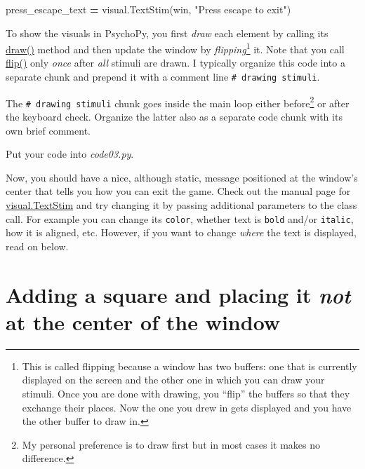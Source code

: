 \documentclass[
]{book}
\newenvironment{Shaded}{\begin{snugshade}}{\end{snugshade}}
\newcommand{\NormalTok}[1]{#1}
\newcommand{\OperatorTok}[1]{\textcolor[rgb]{0.81,0.36,0.00}{\textbf{#1}}}
\newcommand{\StringTok}[1]{\textcolor[rgb]{0.31,0.60,0.02}{#1}}
\begin{document}
\begin{Shaded}
\begin{Highlighting}[]
\NormalTok{press\_escape\_text }\OperatorTok{=}\NormalTok{ visual.TextStim(win, }\StringTok{"Press escape to exit"}\NormalTok{)}
\end{Highlighting}
\end{Shaded}

To show the visuals in PsychoPy, you first \emph{draw} each element by calling its \href{https://psychopy.org/api/visual/textstim.html\#psychopy.visual.TextStim.draw}{draw()} method and then update the window by \emph{flipping}\footnote{This is called flipping because a window has two buffers: one that is currently displayed on the screen and the other one in which you can draw your stimuli. Once you are done with drawing, you ``flip'' the buffers so that they exchange their places. Now the one you drew in gets displayed and you have the other buffer to draw in.} it. Note that you call \href{https://psychopy.org/api/visual/window.html\#psychopy.visual.Window.flip}{flip()} only \emph{once} after \emph{all} stimuli are drawn. I typically organize this code into a separate chunk and prepend it with a comment line \texttt{\#\ drawing\ stimuli}.

The \texttt{\#\ drawing\ stimuli} chunk goes inside the main loop either before\footnote{My personal preference is to draw first but in most cases it makes no difference.} or after the keyboard check. Organize the latter also as a separate code chunk with its own brief comment.

Put your code into \emph{code03.py}.

Now, you should have a nice, although static, message positioned at the window's center that tells you how you can exit the game. Check out the manual page for \href{https://psychopy.org/api/visual/textstim.html}{visual.TextStim} and try changing it by passing additional parameters to the class call. For example you can change its \texttt{color}, whether text is \texttt{bold} and/or \texttt{italic}, how it is aligned, etc. However, if you want to change \emph{where} the text is displayed, read on below.

\hypertarget{adding-a-square-and-placing-it-not-at-the-center-of-the-window}{%
\section{\texorpdfstring{Adding a square and placing it \emph{not} at the center of the window}{Adding a square and placing it not at the center of the window}}\label{adding-a-square-and-placing-it-not-at-the-center-of-the-window}}
\end{document}
